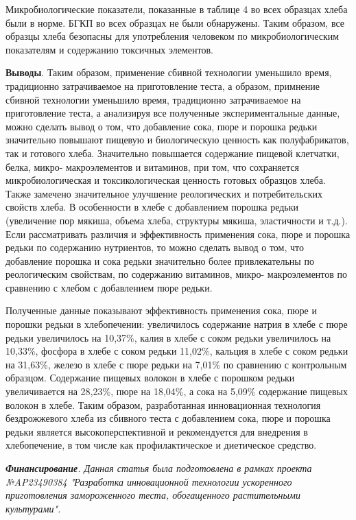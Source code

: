 \begin{multicols}{2}
Микробиологические показатели, показанные в таблице 4 во всех образцах
хлеба были в норме. БГКП во всех образцах не были обнаружены. Таким
образом, все образцы хлеба безопасны для употребления человеком по
микробиологическим показателям и содержанию токсичных элементов.

{\bfseries Выводы}. Таким образом, применение сбивной технологии уменьшило
время, традиционно затрачиваемое на приготовление теста, а образом,
примнение сбивной технологии уменьшило время, традиционно затрачиваемое
на приготовление теста, а анализируя все полученные экспериментальные
данные, можно сделать вывод о том, что добавление сока, пюре и порошка
редьки значительно повышают пищевую и биологическую ценность как
полуфабрикатов, так и готового хлеба. Значительно повышается содержание
пищевой клетчатки, белка, микро- макроэлементов и витаминов, при том,
что сохраняется микробиологическая и токсикологическая ценность готовых
образцов хлеба. Также замечено значительное улучшение реологических и
потребительских свойств хлеба. В особенности в хлебе с добавлением
порошка редьки (увеличение пор мякиша, объема хлеба, структуры мякиша,
эластичности и т.д.). Если рассматривать различия и эффективность
применения сока, пюре и порошка редьки по содержанию нутриентов, то
можно сделать вывод о том, что добавление порошка и сока редьки
значительно более привлекательны по реологическим свойствам, по
содержанию витаминов, микро- макроэлементов по сравнению с хлебом с
добавлением пюре редьки.

Полученные данные показывают эффективность применения сока, пюре и
порошки редьки в хлебопечении: увеличилось содержание натрия в хлебе с
пюре редьки увеличилось на 10,37\%, калия в хлебе с соком редьки
увеличилось на 10,33\%, фосфора в хлебе с соком редьки 11,02\%, кальция
в хлебе с соком редьки на 31,63\%, железо в хлебе с пюре редьки на
7,01\% по сравнению с контрольным образцом. Содержание пищевых волокон в
хлебе с порошком редьки увеличивается на 28,23\%, пюре на 18,04\%, а
сока на 5,09\% содержание пищевых волокон в хлебе. Таким образом,
разработанная инновационная технология бездрожжевого хлеба из сбивного
теста с добавлением сока, пюре и порошка редьки является
высокоперспективной и рекомендуется для внедрения в хлебопечение, в том
числе как профилактическое и диетическое средство.

\emph{{\bfseries Финансирование}. Данная статья была подготовлена в рамках
проекта №AP23490384 "Разработка инновационной технологии ускоренного
приготовления замороженного теста, обогащенного растительными
культурами".}
\end{multicols}

